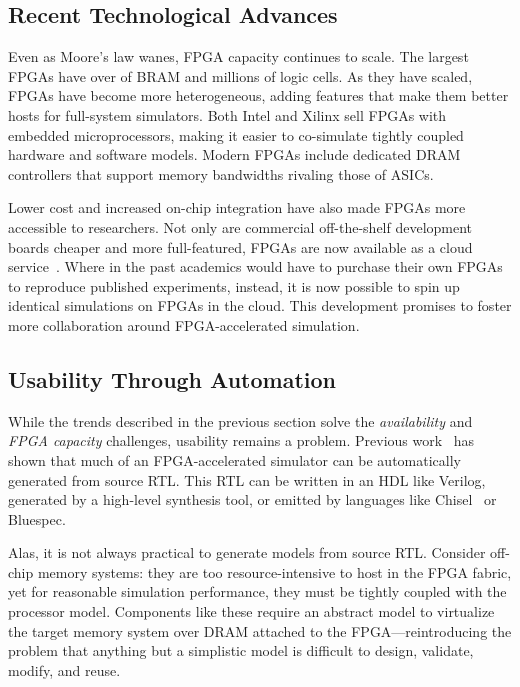 \subsection{Recent Technological Advances}

Even as Moore's law wanes, FPGA capacity continues to scale. The largest FPGAs
have over  of BRAM and millions of logic cells.
As they
have scaled, FPGAs have become more heterogeneous, adding features that make
them better hosts for full-system simulators.  Both Intel and Xilinx sell FPGAs
with embedded microprocessors, making it easier to co-simulate tightly coupled
hardware and software models. Modern FPGAs include dedicated DRAM
controllers that support memory bandwidths rivaling those of ASICs.

Lower cost and increased on-chip integration have also made FPGAs more
accessible to researchers.  Not only are commercial off-the-shelf development
boards cheaper and more full-featured, FPGAs are now available as a cloud service~\cite{amazonf1}.
Where in the past academics would have to purchase their own FPGAs to reproduce
published experiments, instead, it is now possible to spin up identical
simulations on FPGAs in the cloud.  This development promises to foster more
collaboration around FPGA-accelerated simulation.

\subsection{Usability Through Automation}

While the trends described in the previous section solve the
\emph{availability} and \emph{FPGA capacity} challenges, usability remains a
problem. Previous work~\cite{fabscalarfpga, strober} has shown that much of an
FPGA-accelerated simulator can be automatically generated from source RTL. This RTL
can be written in an HDL like Verilog, generated by a high-level synthesis
tool, or emitted by languages like Chisel~\cite{Chisel} or Bluespec.

Alas, it is not always practical to generate models from source
RTL. Consider off-chip memory systems: they are too resource-intensive to host
in the FPGA fabric, yet for reasonable simulation performance, they must be
tightly coupled with the processor model.  Components like these require
an abstract model to virtualize the target memory system over DRAM attached
to the FPGA---reintroducing the problem that anything
but a simplistic model is difficult to design, validate, modify, and reuse.

